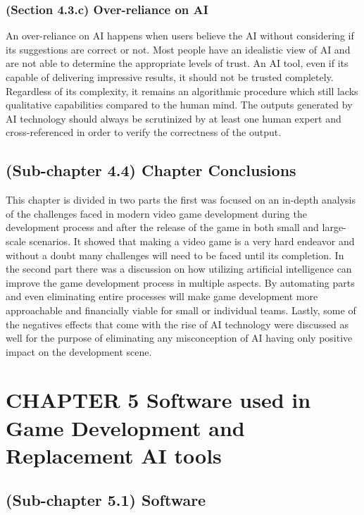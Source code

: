 \documentclass[a4paper,one side,12pt]{book}
\begin{document}
\subsection{(Section 4.3.c) Over-reliance on AI}

An over-reliance on AI happens when users believe the AI without considering if its suggestions
are correct or not. Most people have an idealistic view of AI and are not able to determine
the appropriate levels of trust.
An AI tool, even if its capable of delivering impressive results, it should not be trusted
completely. Regardless of its complexity, it remains an algorithmic procedure which still 
lacks qualitative capabilities compared to the human mind. The outputs generated by AI technology
should always be scrutinized by at least one human expert and cross-referenced in order to verify 
the correctness of the output.


\section{(Sub-chapter 4.4) Chapter Conclusions}

This chapter is divided in two parts the first was focused on an
in-depth analysis of the challenges faced in modern video game
development during the development process and after the release of the
game in both small and large-scale scenarios. It showed that making a
video game is a very hard endeavor and without a doubt many challenges
will need to be faced until its completion. In the second part there was
a discussion on how utilizing artificial intelligence can improve the
game development process in multiple aspects. By automating parts and
even eliminating entire processes will make game development more
approachable and financially viable for small or individual teams.
Lastly, some of the negatives effects that come with the rise of AI 
technology were discussed as well for the purpose of eliminating any
misconception of AI having only positive impact on the development scene.

\pagebreak

\chapter{CHAPTER 5 Software used in Game Development and Replacement AI tools}


\section{(Sub-chapter 5.1) Software}
\end{document}
